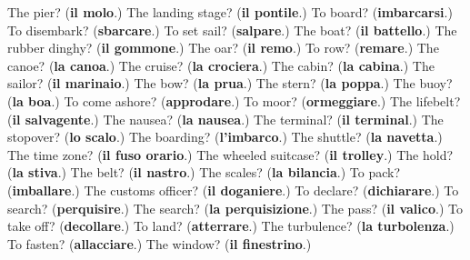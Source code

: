 \begin{tcolorbox}[breakable,colback=teal!4,colframe=teal!35!black,title={Before you move on}]
The pier? (\textbf{il molo}.) The landing stage? (\textbf{il pontile}.) To board? (\textbf{imbarcarsi}.) To disembark? (\textbf{sbarcare}.) To set sail? (\textbf{salpare}.) The boat? (\textbf{il battello}.) The rubber dinghy? (\textbf{il gommone}.) The oar? (\textbf{il remo}.) To row? (\textbf{remare}.) The canoe? (\textbf{la canoa}.) The cruise? (\textbf{la crociera}.) The cabin? (\textbf{la cabina}.) The sailor? (\textbf{il marinaio}.) The bow? (\textbf{la prua}.) The stern? (\textbf{la poppa}.) The buoy? (\textbf{la boa}.) To come ashore? (\textbf{approdare}.) To moor? (\textbf{ormeggiare}.) The lifebelt? (\textbf{il salvagente}.) The nausea? (\textbf{la nausea}.) The terminal? (\textbf{il terminal}.) The stopover? (\textbf{lo scalo}.) The boarding? (\textbf{l'imbarco}.) The shuttle? (\textbf{la navetta}.) The time zone? (\textbf{il fuso orario}.) The wheeled suitcase? (\textbf{il trolley}.) The hold? (\textbf{la stiva}.) The belt? (\textbf{il nastro}.) The scales? (\textbf{la bilancia}.) To pack? (\textbf{imballare}.) The customs officer? (\textbf{il doganiere}.) To declare? (\textbf{dichiarare}.) To search? (\textbf{perquisire}.) The search? (\textbf{la perquisizione}.) The pass? (\textbf{il valico}.) To take off? (\textbf{decollare}.) To land? (\textbf{atterrare}.) The turbulence? (\textbf{la turbolenza}.) To fasten? (\textbf{allacciare}.) The window? (\textbf{il finestrino}.)
\end{tcolorbox}
